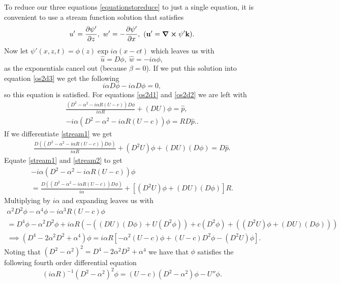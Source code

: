 To reduce our three equations \eqref{equationstoreduce} to just a single equation, it is convenient to use a stream function solution that satisfies
\begin{equation}
    u' = \pdv{\psi'}{z}, \ w' = - \pdv{\psi'}{x},  \ (\mathbf{u}' = \curl{\psi' \mathbf{k}}).
    \label{streamfunction}
\end{equation}
Now let $ \psi'(x, z, t) = \phi(z) \exp{i \alpha(x - ct)} $ which leaves us with
\begin{equation}
    \hat{u} = D \phi, \  \hat{w} = -i \alpha \phi, 
\end{equation}
as the exponentials cancel out (because $ \beta = 0$).
If we put this solution into equation \eqref{os2d3} we get the following
\begin{equation}
    i \alpha D \phi - i \alpha D \phi = 0,
\end{equation}
so this equation is satisfied. For equations \eqref{os2d1} and \eqref{os2d2} we are left with
\begin{gather}
    \frac{(D^2 - \alpha^2 - i \alpha R ( U - c)) D \phi}{i \alpha R} + (DU) \phi = \hat{p}, \label{stream1}\\
    -i \alpha (D^2 - \alpha^2 - i \alpha R (U - c)) \phi = R D \hat{p}. \label{stream2}.
\end{gather}
If we differentiate \eqref{stream1} we get
\begin{gather}
     \frac{D((D^2 - \alpha^2 - i \alpha R ( U - c)) D \phi)}{i \alpha R} + (D^2 U) \phi + (DU)(D \phi) = D \hat{p}.
\end{gather}
Equate \eqref{stream1} and \eqref{stream2} to get
\begin{gather}
        -i \alpha (D^2 - \alpha^2 - i \alpha R (U - c)) \phi \nonumber\\ = \frac{D((D^2 - \alpha^2 - i \alpha R ( U - c)) D \phi)}{i \alpha} + [(D^2 U) \phi + (DU)(D \phi)] R.
\end{gather}
Multiplying by $ i \alpha $ and expanding leaves us with 
\begin{gather}
    \alpha^2 D^2 \phi - \alpha^4 \phi - i \alpha^3 R (U - c) \phi\nonumber\\  = D^4 \phi - \alpha^2 D^2 \phi + i \alpha R (-( (DU) (D\phi) + U (D^2 \phi)) + c (D^2 \phi) + ((D^2 U) \phi + (DU)(D\phi))) 
    \nonumber\\ 
    \implies (D^4 - 2 \alpha^2 D^2 + \alpha^4) \phi = i \alpha R [- \alpha^2 (U - c) \phi + (U - c)D^2\phi - (D^2U)\phi].
\end{gather}
Noting that $ (D^2 - \alpha^2)^2 = D^4 - 2 \alpha^2 D^2 + \alpha^4 $ we have that $ \phi $ satisfies the following fourth order differential equation 
\begin{equation}
    (i \alpha R)^{-1} (D^2 - \alpha^2)^2 \phi = (U - c)(D^2 - \alpha^2)\phi - U'' \phi.
\label{oseq}
\end{equation}

